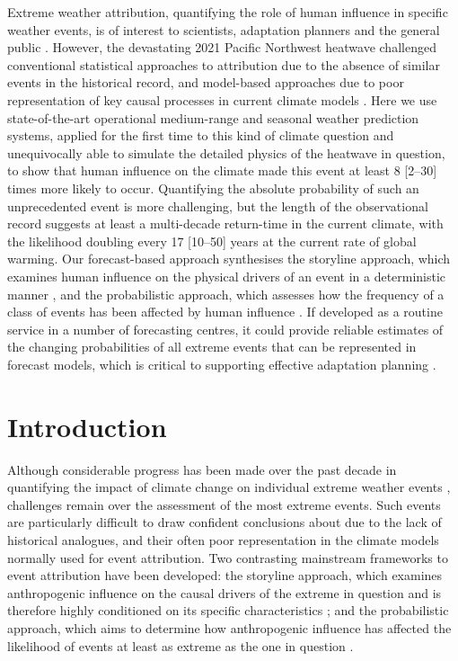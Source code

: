   Extreme weather attribution, quantifying the role of human influence in specific weather events, is of interest to scientists, adaptation planners and the general public \cite{national_academies_of_sciences_engineering_and_medicine_attribution_2016}. However, the devastating 2021 Pacific Northwest heatwave challenged conventional statistical approaches to attribution due to the absence of similar events in the historical record, and model-based approaches due to poor representation of key causal processes in current climate models \cite{white_unprecedented_2022}. Here we use state-of-the-art operational medium-range and seasonal weather prediction systems, applied for the first time to this kind of climate question and unequivocally able to simulate the detailed physics of the heatwave in question, to show that human influence on the climate made this event at least 8 [2--30] times more likely to occur. Quantifying the absolute probability of such an unprecedented event is more challenging, but the length of the observational record suggests at least a multi-decade return-time in the current climate, with the likelihood doubling every 17 [10--50] years at the current rate of global warming. Our forecast-based approach synthesises the storyline approach, which examines human influence on the physical drivers of an event in a deterministic manner \cite{shepherd_common_2016}, and the probabilistic approach, which assesses how the frequency of a class of events has been affected by human influence \cite{stott_human_2004}. If developed as a routine service in a number of forecasting centres, it could provide reliable estimates of the changing probabilities of all extreme events that can be represented in forecast models, which is critical to supporting effective adaptation planning \cite{harrington_integrating_2022,mitchell_climate_2021}.

\section{Introduction}

  Although considerable progress has been made over the past decade in quantifying the impact of climate change on individual extreme weather events \cite{stott_human_2004,national_academies_of_sciences_engineering_and_medicine_attribution_2016}, challenges remain over the assessment of the most extreme events. Such events are particularly difficult to draw confident conclusions about due to the lack of historical analogues, and their often poor representation in the climate models normally used for event attribution. Two contrasting mainstream frameworks to event attribution have been developed: the storyline approach, which examines anthropogenic influence on the causal drivers of the extreme in question and is therefore highly conditioned on its specific characteristics \cite{trenberth_attribution_2015,shepherd_common_2016,hoerling_anatomy_2013}; and the probabilistic approach, which aims to determine how anthropogenic influence has affected the likelihood of events at least as extreme as the one in question \cite{philip_protocol_2020,pall_anthropogenic_2011}. 

